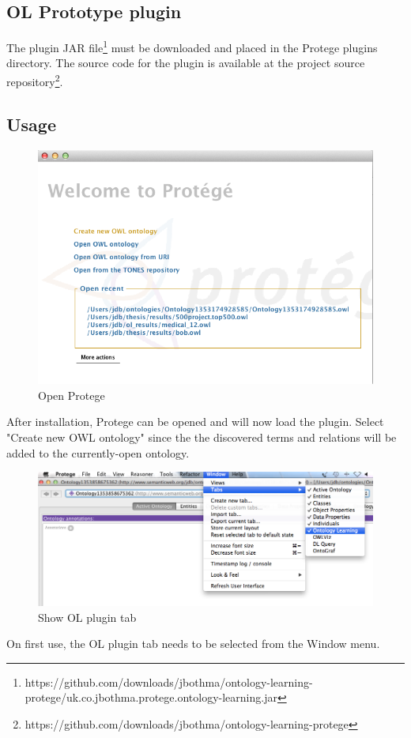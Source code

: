 \documentclass[a4paper]{report}
\begin{document}
\subsection{OL Prototype plugin}

The plugin JAR file\footnote{https://github.com/downloads/jbothma/ontology-learning-protege/uk.co.jbothma.protege.ontology-learning.jar} must be downloaded and placed in the Protege plugins directory.
The source code for the plugin is available at the project source repository\footnote{https://github.com/downloads/jbothma/ontology-learning-protege}.

\subsection{Usage}
\begin{figure}[H]
  \centering
  \includegraphics[width=.69\textwidth]{graphics/1._Open_Protege.png}
  \caption{Open Protege}
  \label{fig:walkthrough1}
\end{figure}
After installation, Protege can be opened and will now load the plugin. Select "Create new OWL ontology" since the the discovered terms and relations will be added to the currently-open ontology.

\begin{figure}[H]
  \centering
  \includegraphics[width=\textwidth]{graphics/2._Show_OL_plugin_tab.png}
  \caption{Show OL plugin tab}
  \label{fig:walkthrough2}
\end{figure}
On first use, the OL plugin tab needs to be selected from the Window menu. 
\end{document}
